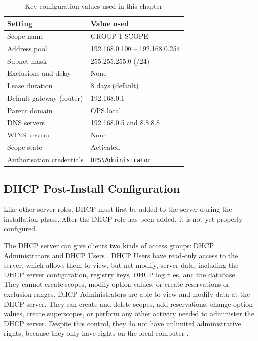 \begin{table}[H]
  \centering
  \small\sffamily
  \renewcommand{\arraystretch}{1.3}
  \begin{tabular}{@{}p{5.6cm}p{8.6cm}@{}}
    \toprule
    \textbf{Setting} & \textbf{Value used} \\
    \midrule
    Scope name & GROUP 1-SCOPE \\
    Address pool & 192.168.0.100 -- 192.168.0.254 \\
    Subnet mask & 255.255.255.0 (/24) \\
    Exclusions and delay & None \\
    Lease duration & 8 days (default) \\
    Default gateway (router) & 192.168.0.1 \\
    Parent domain & OPS.local \\
    DNS servers & 192.168.0.5 and 8.8.8.8 \\
    WINS servers & None \\
    Scope state & Activated \\
    Authorisation credentials & \texttt{OPS\textbackslash Administrator} \\
    \bottomrule
  \end{tabular}
  \caption{Key configuration values used in this chapter}\label{tab:dhcp-config}
\end{table}

\subsection{DHCP Post-Install Configuration}
\label{sec:dhcp-post}
Like other server roles, DHCP must first be added to the server during the installation phase. After the DHCP role has been added, it is not yet properly configured.

The DHCP server can give clients two kinds of access groups: DHCP Administrators and DHCP Users \cite{dhcp-groups}. DHCP Users have read-only access to the server, which allows them to view, but not modify, server data, including the DHCP server configuration, registry keys, DHCP log files, and the database. They cannot create scopes, modify option values, or create reservations or exclusion ranges. DHCP Administrators are able to view and modify data at the DHCP server. They can create and delete scopes, add reservations, change option values, create superscopes, or perform any other activity needed to administer the DHCP server. Despite this control, they do not have unlimited administrative rights, because they only have rights on the local computer \cite{dhcp-groups}.

